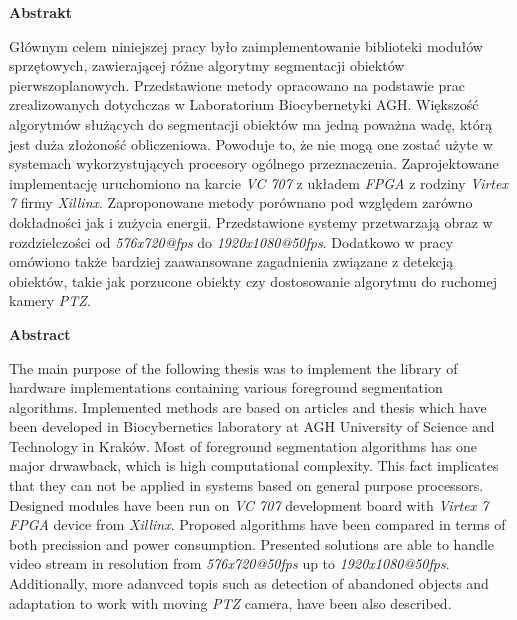 \documentclass[11pt]{aghdpl}
\author{Piotr Janus}
\date{2017}
\begin{document}
\titlepages

{
	\fancyhf{}
	\renewcommand{\headrulewidth}{0pt}
	\renewcommand{\footrulewidth}{0pt}
}

\setcounter{tocdepth}{2}
\tableofcontents
\clearpage

\begin{center}
    \textbf{Abstrakt}
\end{center}

Głównym celem niniejszej pracy było zaimplementowanie biblioteki modułów sprzętowych, zawierającej różne algorytmy segmentacji obiektów pierwszoplanowych. Przedstawione metody opracowano na podstawie prac zrealizowanych dotychczas w Laboratorium Biocybernetyki AGH. Większość algorytmów służących do segmentacji obiektów  ma jedną poważna wadę, którą jest duża złożoność obliczeniowa. Powoduje to, że nie mogą one zostać użyte w systemach wykorzystujących procesory ogólnego przeznaczenia. Zaprojektowane implementację uruchomiono na karcie \textit{VC 707} z układem \textit{FPGA} z rodziny \textit{Virtex 7} firmy \textit{Xillinx}. Zaproponowane metody porównano pod względem zarówno dokładności jak i zużycia energii. Przedstawione systemy przetwarzają obraz w rozdzielczości od \textit{576x720@fps} do \textit{1920x1080@50fps}. Dodatkowo w pracy omówiono także bardziej zaawansowane zagadnienia związane z detekcją obiektów, takie jak porzucone obiekty czy dostosowanie algorytmu do ruchomej kamery \textit{PTZ}.


\begin{center}
    \textbf{Abstract}
\end{center}

The main purpose of the following thesis was to implement the library of hardware implementations containing various foreground segmentation algorithms. Implemented methods are based on articles and thesis which have been developed in   Biocybernetics laboratory at AGH University of Science and Technology in Kraków. Most of foreground segmentation algorithms has one major drwawback, which is high computational complexity. This fact implicates that they can not be applied in systems based on general purpose processors. Designed modules have been run on \textit{VC 707} development board with \textit{Virtex 7 FPGA} device from \textit{Xillinx}. Proposed algorithms have been compared in terms of both precission and power consumption. Presented solutions are able to handle video stream in resolution from \textit{576x720@50fps} up to \textit{1920x1080@50fps}. Additionally, more adanvced topis such as detection of abandoned objects and adaptation to work with moving \textit{PTZ} camera, have been also described. 









\printbibliography

\appendix


\end{document}
